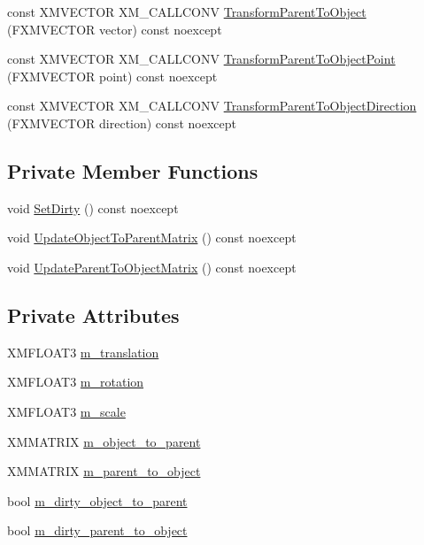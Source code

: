 \begin{DoxyCompactItemize}
\item 
const X\+M\+V\+E\+C\+T\+OR X\+M\+\_\+\+C\+A\+L\+L\+C\+O\+NV \hyperlink{structmage_1_1_transform_a305841f6bbc0a4eadaacbce2918b438c}{Transform\+Parent\+To\+Object} (F\+X\+M\+V\+E\+C\+T\+OR vector) const noexcept
\item 
const X\+M\+V\+E\+C\+T\+OR X\+M\+\_\+\+C\+A\+L\+L\+C\+O\+NV \hyperlink{structmage_1_1_transform_a4b420feb6f839d045a0239056b47772d}{Transform\+Parent\+To\+Object\+Point} (F\+X\+M\+V\+E\+C\+T\+OR point) const noexcept
\item 
const X\+M\+V\+E\+C\+T\+OR X\+M\+\_\+\+C\+A\+L\+L\+C\+O\+NV \hyperlink{structmage_1_1_transform_a0f84d13bf0016a6c98d84ccf0d357b50}{Transform\+Parent\+To\+Object\+Direction} (F\+X\+M\+V\+E\+C\+T\+OR direction) const noexcept
\end{DoxyCompactItemize}
\subsection*{Private Member Functions}
\begin{DoxyCompactItemize}
\item 
void \hyperlink{structmage_1_1_transform_a8d760d79f5ad68377706234b8575e429}{Set\+Dirty} () const noexcept
\item 
void \hyperlink{structmage_1_1_transform_ae959687d6ffe73bda0a71f2f6f4b9dbe}{Update\+Object\+To\+Parent\+Matrix} () const noexcept
\item 
void \hyperlink{structmage_1_1_transform_a55829fd7bc87753f6a1c6facfc12ca80}{Update\+Parent\+To\+Object\+Matrix} () const noexcept
\end{DoxyCompactItemize}
\subsection*{Private Attributes}
\begin{DoxyCompactItemize}
\item 
X\+M\+F\+L\+O\+A\+T3 \hyperlink{structmage_1_1_transform_a57e27b28e0cf85be034055a68513ad79}{m\+\_\+translation}
\item 
X\+M\+F\+L\+O\+A\+T3 \hyperlink{structmage_1_1_transform_a037b4fb338bfe79aa2ab1a2e809c40df}{m\+\_\+rotation}
\item 
X\+M\+F\+L\+O\+A\+T3 \hyperlink{structmage_1_1_transform_a25d15c85b93037bab5b755c86bef0b54}{m\+\_\+scale}
\item 
X\+M\+M\+A\+T\+R\+IX \hyperlink{structmage_1_1_transform_ad21d0547b1648f22f6b28db044b1d4bd}{m\+\_\+object\+\_\+to\+\_\+parent}
\item 
X\+M\+M\+A\+T\+R\+IX \hyperlink{structmage_1_1_transform_a4ca7fe2fe7ec7e09cda91e6af63f07f9}{m\+\_\+parent\+\_\+to\+\_\+object}
\item 
bool \hyperlink{structmage_1_1_transform_a0b6df5bbb04bb38efb3123b4749afc98}{m\+\_\+dirty\+\_\+object\+\_\+to\+\_\+parent}
\item 
bool \hyperlink{structmage_1_1_transform_a3d415d6a36e2307538c2da461e517a6d}{m\+\_\+dirty\+\_\+parent\+\_\+to\+\_\+object}
\end{DoxyCompactItemize}
